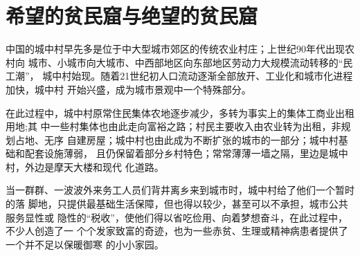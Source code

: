 








\section{希望的贫民窟与绝望的贫民窟}
\label{sec:hopedespair}

中国的城中村早先多是位于中大型城市郊区的传统农业村庄；上世纪90年代出现农村向
城市、小城市向大城市、中西部地区向东部地区劳动力大规模流动转移的“民工潮”，
城中村始现。随着21世纪初人口流动逐渐全部放开、工业化和城市化进程加快，城中村
开始兴盛，成为城市景观中一个特殊部分。

在此过程中，城中村原常住民集体农地逐步减少，多转为事实上的集体工商业出租用地;其
中一些村集体也由此走向富裕之路；村民主要收入由农业转为出租，非规划占地、无序
自建房屋；城中村也由此成为不断扩张的城市的一部分；城中村基础和配套设施薄弱，
且仍保留着部分乡村特色；常常薄薄一墙之隔，里边是城中村，外边是摩天大楼和现代
化道路。

当一群群、一波波外来务工人员们背井离乡来到城市时，城中村给了他们一个暂时的落
脚地，只提供最基础生活保障，但也得以较少，甚至可以不承担，城市公共服务显性或
隐性的“税收”，使他们得以省吃俭用、向着梦想奋斗，在此过程中，不少人创造了一
个个发家致富的奇迹，也为一些赤贫、生理或精神病患者提供了一个并不足以保暖御寒
的小小家园。

